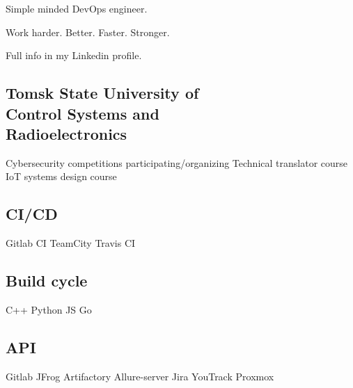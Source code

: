 \documentclass[a4paper]{MagicalCV}
\begin{document}
\lastupdated


\begin{minipage}[t]{0.34\textwidth} 


Simple minded DevOps engineer.

Work harder. Better. Faster. Stronger.

Full info in my Linkedin profile.
\sectionsep





\sectionsep


\subsection{Tomsk State University of \\ Control Systems and \\ Radioelectronics}
\vspace{\topsep} %
Cybersecurity competitions participating/organizing \textbullet{} Technical translator course \textbullet{} IoT systems design course
\sectionsep


\subsection{CI/CD}
Gitlab CI \textbullet{} 
TeamCity \textbullet{} 
Travis CI 
\subsection{Build cycle}
C++ \textbullet{} 
Python \textbullet{} 
JS \textbullet{} 
Go
\subsection{API}
Gitlab \textbullet{} 
JFrog Artifactory \textbullet{} 
Allure-server \textbullet{}
Jira \textbullet{} 
YouTrack \textbullet{} 
Proxmox

\end{minipage}
\end{document}
